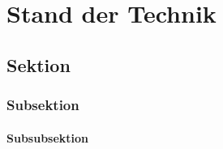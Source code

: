 \chapter{Stand der Technik}
\label{ch:StandTechnik}





\section{Sektion}
\lipsum[1]




\subsection{Subsektion}
\lipsum[1]



\subsubsection{Subsubsektion}
\lipsum[1-5]






















